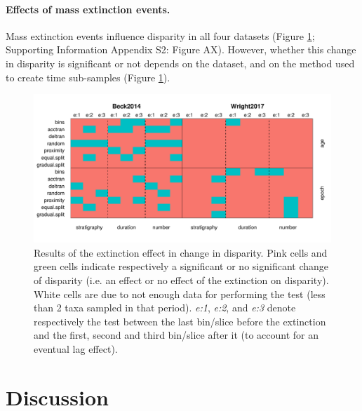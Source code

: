 \documentclass[12pt,a4paper]{article}
\begin{document}

\paragraph{Effects of mass extinction events.}
Mass extinction events influence disparity in all four datasets (Figure \ref{figure:extinction1}; Supporting Information Appendix S2: Figure AX). %
However, whether this change in disparity is significant or not depends on the dataset, and on the method used to create time sub-samples (Figure \ref{figure:extinction1}). %

  \begin{figure}[!htbp]
    \centering
    \includegraphics[width=1\linewidth, height=1\textheight, keepaspectratio]{figures/fig-extinction-effect.pdf}
    \caption[Extinction four example datasets.]
    {Results of the extinction effect in change in disparity.
    Pink cells and green cells indicate respectively a significant or no significant change of disparity (i.e. an effect or no effect of the extinction on disparity).
    White cells are due to not enough data for performing the test (less than 2 taxa sampled in that period).
    \textit{e:1}, \textit{e:2}, and \textit{e:3} denote respectively the test between the last bin/slice before the extinction and the first, second and third bin/slice after it (to account for an eventual lag effect).}
    \label{figure:extinction1}
  \end{figure}


\section{Discussion}
\end{document}
